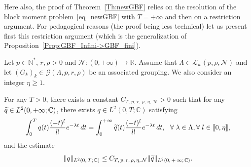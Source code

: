 \documentclass[AHL,Unicode,longabstracts]{cedram}
\newcommand{\llbracket}{\mathopen{[\mkern -2.7mu[}}
\newcommand{\rrbracket}{\mathclose{]\mkern -2.7mu]}}
\newcommand{\inter}[2]{\llbracket #1,#2 \rrbracket}
\newcommand{\LL}{\mathcal{L}}
\newcommand{\NN}{\mathcal{N}}
\newcommand{\N}{\mathbb{N}}
\newcommand{\R}{\mathbb{R}}
\newcommand{\C}{\mathbb{C}}
\let\oldtilde\tilde
\renewcommand*{\tilde}[1]{\mathchoice{\widetilde{#1}}{\widetilde{#1}}{\oldtilde{#1}}{\oldtilde{#1}}}\let\oldexists\exists
\renewcommand*{\exists}{\mathrel{\oldexists}}
\let\oldforall\forall
\renewcommand*{\forall}{\mathrel{\oldforall}}
\begin{document}
Here also, the proof of Theorem~\ref{Th:newGBF} relies on the resolution of the block moment problem~\eqref{eq_newGBF} with $T=+\infty$ and then on a restriction argument. For pedagogical reasons (the proof being less technical) let us present first this restriction argument (which is the generalization of Proposition~\ref{Prop:GBF_Infini->GBF_fini}).

\begin{prop}\label{Prop:newGBF_Infini->GBF_fini}
Let $p \in \N^*$, $r, \rho > 0$ and $\NN : (0,+\infty) \to \R$. Assume that $\Lambda \in \LL_w(p,\rho, \NN)$ and let $(G_k)_k\in \mathcal{G}(\Lambda,p,r,\rho)$ be an associated grouping. We also consider an integer $\eta\geq 1$.

For any $T>0$, there exists a constant $C_{T,\, p,\, r,\, \rho,\, \eta,\, \NN} >0$ such that for any $\tilde{q}\in L^2(0,+\infty;\C)$, there exists $q\in L^2(0,T;\C)$ satisfying
\[
\int_0^{T} q(t) \frac{(-t)^l}{l!} e^{-\lambda t} \, dt = \int_0^{+\infty} \tilde{q}(t) \frac{(-t)^l}{l!} e^{-\lambda t} \, dt, \ \ \forall \lambda\in \Lambda, \forall l\in \inter{0}{\eta},
\]
and the estimate
\[
\|q\|_{L^2(0,\,T;\,\C)}\leq C_{T,\, p,\, r,\, \rho, \,\eta,\, \NN} \|\tilde{q}\|_{L^2(0,\,+\,\infty;\,\C)}.
\]
\end{prop}
\end{document}
